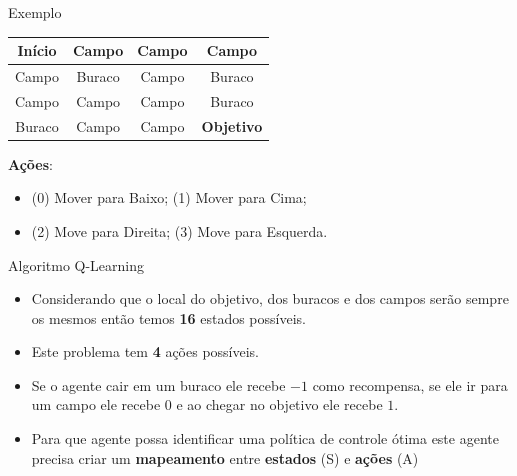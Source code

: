 \documentclass{beamer}
\begin{document}
\begin{frame}{Exemplo}
	\begin{center}
		\begin{tabular}{ |c|c|c|c| } 
			\hline
			\cellcolor{red!25} Início & Campo & Campo & Campo \\ 
			\hline
			Campo & \cellcolor{black!25} Buraco & Campo &  \cellcolor{black!25} Buraco\\ 
			\hline
			 Campo & Campo & Campo & \cellcolor{black!25} Buraco\\ 
			\hline
			\cellcolor{black!25} Buraco & Campo & Campo & \textbf{Objetivo} \\ 
			\hline
		\end{tabular}
	\end{center}

\vspace{0.2cm}
\small
\textbf{Ações}: 
\begin{itemize}
	\item (0) Mover para Baixo; (1)	Mover para Cima; 
	\item (2) Move para Direita; (3) Move para Esquerda.
\end{itemize}

\end{frame}


\begin{frame}{Algoritmo Q-Learning}

\begin{itemize}
	\item Considerando que o local do objetivo, dos buracos e dos campos serão sempre 
	os mesmos então temos \textbf{16} estados possíveis. 
	\item Este problema tem \textbf{4} ações possíveis. 
	\item Se o agente cair em um buraco ele recebe $-1$ como recompensa, se ele ir para um 
	campo ele recebe $0$ e ao chegar no objetivo ele recebe $1$.  
	\item Para que agente possa identificar uma política de controle ótima este agente 
	precisa criar um \textbf{mapeamento} entre \textbf{estados} (S) e \textbf{ações} (A)
	
\end{itemize}

\end{frame}
\end{document}
